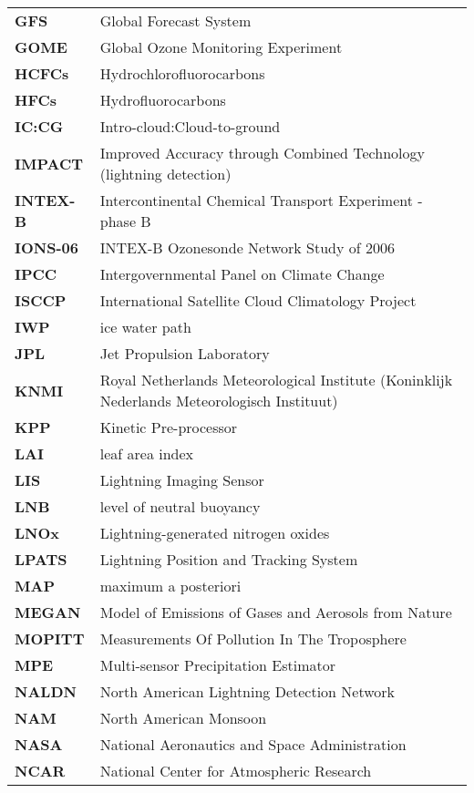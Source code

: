 \begin{longtable}{p{1.5in}p{5.5in}}
\textbf{GFS} & Global Forecast System\\
\textbf{GOME} & Global Ozone Monitoring Experiment\\
\textbf{HCFCs} & Hydrochlorofluorocarbons\\
\textbf{HFCs} & Hydrofluorocarbons\\
\textbf{IC:CG} & Intro-cloud:Cloud-to-ground\\
\textbf{IMPACT} & Improved Accuracy through Combined Technology (lightning detection)\\
\textbf{INTEX-B} & Intercontinental Chemical Transport Experiment - phase B\\
\textbf{IONS-06} & INTEX-B Ozonesonde Network Study of 2006\\
\textbf{IPCC} & Intergovernmental Panel on Climate Change\\
\textbf{ISCCP} & International Satellite Cloud Climatology Project\\
\textbf{IWP} & ice water path\\
\textbf{JPL} & Jet Propulsion Laboratory\\
\textbf{KNMI} & Royal Netherlands Meteorological Institute \newline (Koninklijk Nederlands Meteorologisch Instituut)\\
\textbf{KPP} & Kinetic Pre-processor\\
\textbf{LAI} & leaf area index\\
\textbf{LIS} & Lightning Imaging Sensor\\
\textbf{LNB} & level of neutral buoyancy\\
\textbf{LNOx} & Lightning-generated nitrogen oxides\\
\textbf{LPATS} & Lightning Position and Tracking System\\
\textbf{MAP} & maximum a posteriori\\
\textbf{MEGAN} & Model of Emissions of Gases and Aerosols from Nature\\
\textbf{MOPITT} & Measurements Of Pollution In The Troposphere\\
\textbf{MPE} & Multi-sensor Precipitation Estimator\\
\textbf{NALDN} & North American Lightning Detection Network\\
\textbf{NAM} & North American Monsoon\\
\textbf{NASA} & National Aeronautics and Space Administration\\
\textbf{NCAR} & National Center for Atmospheric Research\\

\end{longtable}
